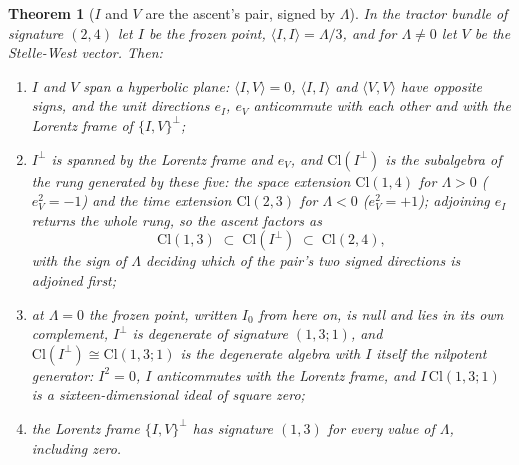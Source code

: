 \documentclass[11pt]{article}
\newtheorem{theorem}{Theorem}[section]
\theoremstyle{definition}
\newcommand{\Cl}{\mathrm{Cl}}
\newcommand{\ip}[2]{\langle #1, #2\rangle}
\begin{document}
\begin{theorem}[$I$ and $V$ are the ascent's pair, signed by $\Lambda$]\label{thm:pair}
In the tractor bundle of signature $(2,4)$ let $I$ be the frozen point, $\ip{I}{I} = \Lambda/3$, and for $\Lambda \neq 0$ let $V$ be the Stelle-West vector. Then:
\begin{enumerate}
\item[(i)] $I$ and $V$ span a hyperbolic plane: $\ip{I}{V} = 0$, $\ip{I}{I}$ and $\ip{V}{V}$ have opposite signs, and the unit directions $e_{I}$, $e_{V}$ anticommute with each other and with the Lorentz frame of $\{I,V\}^{\perp}$;
\item[(ii)] $I^{\perp}$ is spanned by the Lorentz frame and $e_{V}$, and $\Cl(I^{\perp})$ is the subalgebra of the rung generated by these five: the space extension $\Cl(1,4)$ for $\Lambda > 0$ ($e_{V}^{2} = -1$) and the time extension $\Cl(2,3)$ for $\Lambda < 0$ ($e_{V}^{2} = +1$); adjoining $e_{I}$ returns the whole rung, so the ascent factors as
\[
\Cl(1,3) \;\subset\; \Cl(I^{\perp}) \;\subset\; \Cl(2,4),
\]
with the sign of $\Lambda$ deciding which of the pair's two signed directions is adjoined first;
\item[(iii)] at $\Lambda = 0$ the frozen point, written $I_{0}$ from here on, is null and lies in its own complement, $I^{\perp}$ is degenerate of signature $(1,3;1)$, and $\Cl(I^{\perp}) \cong \Cl(1,3;1)$ is the degenerate algebra with $I$ itself the nilpotent generator: $I^{2} = 0$, $I$ anticommutes with the Lorentz frame, and $I\,\Cl(1,3;1)$ is a sixteen-dimensional ideal of square zero;
\item[(iv)] the Lorentz frame $\{I,V\}^{\perp}$ has signature $(1,3)$ for every value of $\Lambda$, including zero.
\end{enumerate}
\end{theorem}
\end{document}
